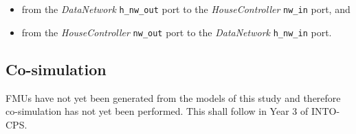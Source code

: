 \begin{itemize}
  \item from the \emph{DataNetwork} \texttt{h\_nw\_out} port to the \emph{HouseController} \texttt{nw\_in} port, and
  \item from the \emph{HouseController}  \texttt{nw\_out} port to the \emph{DataNetwork} \texttt{h\_nw\_in} port.
\end{itemize}

\subsection{Co-simulation}
\label{sec:smartgrid_into_co}

FMUs have not yet been generated from the models of this study and therefore co-simulation has not yet been performed. This shall follow in Year 3 of INTO-CPS.

